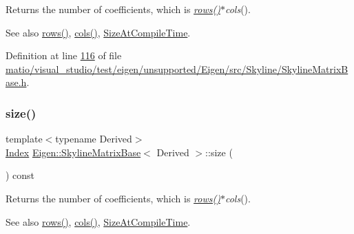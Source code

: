 \begin{DoxyReturn}{Returns}
the number of coefficients, which is {\itshape \hyperlink{class_eigen_1_1_skyline_matrix_base_a8243b2fe6bcc6c3037717fcb0afa9d46}{rows()}$\ast$cols}(). 
\end{DoxyReturn}
\begin{DoxySeeAlso}{See also}
\hyperlink{class_eigen_1_1_skyline_matrix_base_a8243b2fe6bcc6c3037717fcb0afa9d46}{rows()}, \hyperlink{class_eigen_1_1_skyline_matrix_base_aff9cfadb45ffbae8a33b710bc9b49d71}{cols()}, \hyperlink{class_eigen_1_1_skyline_matrix_base_a811ba3961cb927ae5fa84ed278ebceeaacd91cb554fe479f85ab5749902d89217}{Size\+At\+Compile\+Time}. 
\end{DoxySeeAlso}


Definition at line \hyperlink{matio_2visual__studio_2test_2eigen_2unsupported_2_eigen_2src_2_skyline_2_skyline_matrix_base_8h_source_l00116}{116} of file \hyperlink{matio_2visual__studio_2test_2eigen_2unsupported_2_eigen_2src_2_skyline_2_skyline_matrix_base_8h_source}{matio/visual\+\_\+studio/test/eigen/unsupported/\+Eigen/src/\+Skyline/\+Skyline\+Matrix\+Base.\+h}.

\mbox{\label{class_eigen_1_1_skyline_matrix_base_a635234baea6bd59f97e6bd219adbdb64}} 
\subsubsection{\texorpdfstring{size()}{size()}\hspace{0.1cm}{\footnotesize\ttfamily [2/2]}}
{\footnotesize\ttfamily template$<$typename Derived$>$ \\
\hyperlink{group___core___module_a554f30542cc2316add4b1ea0a492ff02}{Index} \hyperlink{class_eigen_1_1_skyline_matrix_base}{Eigen\+::\+Skyline\+Matrix\+Base}$<$ Derived $>$\+::size (\begin{DoxyParamCaption}{ }\end{DoxyParamCaption}) const\hspace{0.3cm}{\ttfamily [inline]}}

\begin{DoxyReturn}{Returns}
the number of coefficients, which is {\itshape \hyperlink{class_eigen_1_1_skyline_matrix_base_a8243b2fe6bcc6c3037717fcb0afa9d46}{rows()}$\ast$cols}(). 
\end{DoxyReturn}
\begin{DoxySeeAlso}{See also}
\hyperlink{class_eigen_1_1_skyline_matrix_base_a8243b2fe6bcc6c3037717fcb0afa9d46}{rows()}, \hyperlink{class_eigen_1_1_skyline_matrix_base_aff9cfadb45ffbae8a33b710bc9b49d71}{cols()}, \hyperlink{class_eigen_1_1_skyline_matrix_base_a811ba3961cb927ae5fa84ed278ebceeaacd91cb554fe479f85ab5749902d89217}{Size\+At\+Compile\+Time}. 
\end{DoxySeeAlso}


